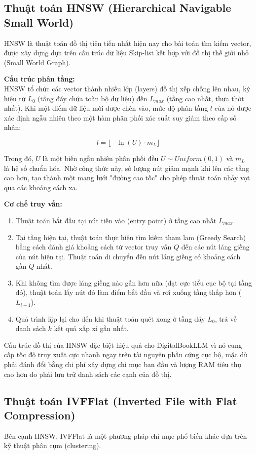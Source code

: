 \subsection{Thuật toán HNSW (Hierarchical Navigable Small World)}
HNSW là thuật toán đồ thị tiên tiến nhất hiện nay cho bài toán tìm kiếm vector, được xây dựng dựa trên cấu trúc dữ liệu Skip-list kết hợp với đồ thị thế giới nhỏ (Small World Graph).

\textbf{Cấu trúc phân tầng:}\\
HNSW tổ chức các vector thành nhiều lớp (layers) đồ thị xếp chồng lên nhau, ký hiệu từ $L_0$ (tầng đáy chứa toàn bộ dữ liệu) đến $L_{max}$ (tầng cao nhất, thưa thớt nhất). Khi một điểm dữ liệu mới được chèn vào, mức độ phân tầng $l$ của nó được xác định ngẫu nhiên theo một hàm phân phối xác suất suy giảm theo cấp số nhân:

$$l = \lfloor -\ln(U) \cdot m_L \rfloor$$

Trong đó, $U$ là một biến ngẫu nhiên phân phối đều $U \sim Uniform(0,1)$ và $m_L$ là hệ số chuẩn hóa. Nhờ công thức này, số lượng nút giảm mạnh khi lên các tầng cao hơn, tạo thành một mạng lưới "đường cao tốc" cho phép thuật toán nhảy vọt qua các khoảng cách xa.

\textbf{Cơ chế truy vấn:}
\begin{enumerate}
    \item Thuật toán bắt đầu tại nút tiến vào (entry point) ở tầng cao nhất $L_{max}$.
    \item Tại tầng hiện tại, thuật toán thực hiện tìm kiếm tham lam (Greedy Search) bằng cách đánh giá khoảng cách từ vector truy vấn $Q$ đến các nút láng giềng của nút hiện tại. Thuật toán di chuyển đến nút láng giềng có khoảng cách gần $Q$ nhất.
    \item Khi không tìm được láng giềng nào gần hơn nữa (đạt cực tiểu cục bộ tại tầng đó), thuật toán lấy nút đó làm điểm bắt đầu và rơi xuống tầng thấp hơn ($L_{i-1}$).
    \item Quá trình lặp lại cho đến khi thuật toán quét xong ở tầng đáy $L_0$, trả về danh sách $k$ kết quả xấp xỉ gần nhất.
\end{enumerate}

Cấu trúc đồ thị của HNSW đặc biệt hiệu quả cho DigitalBookLLM vì nó cung cấp tốc độ truy xuất cực nhanh ngay trên tài nguyên phần cứng cục bộ, mặc dù phải đánh đổi bằng chi phí xây dựng chỉ mục ban đầu và lượng RAM tiêu thụ cao hơn do phải lưu trữ danh sách các cạnh của đồ thị.

\subsection{Thuật toán IVFFlat (Inverted File with Flat Compression)}
Bên cạnh HNSW, IVFFlat là một phương pháp chỉ mục phổ biến khác dựa trên kỹ thuật phân cụm (clustering).

